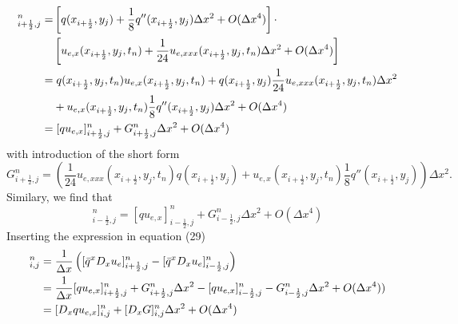 \documentclass[twoside]{article}
\begin{document}
\begin{align}
[\bar{q}D_{x}u_{e}]_{i+\frac{1}{2},j}^{n} =& \left[q(x_{i+\frac{1}{2}},y_{j})+\frac{1}{8}q''(x_{i+\frac{1}{2}},y_{j})\Delta x^{2}+O(\Delta x^{4})\right] \cdot\\ \notag
&\left[u_{e,x}(x_{i+\frac{1}{2}},y_{j},t_{n})+\frac{1}{24}u_{e,xxx}(x_{i+\frac{1}{2}},y_{j},t_{n})\Delta x^{2}+O(\Delta x^{4})\right] \\ \notag
=& \hspace{1mm}q(x_{i+\frac{1}{2}},y_{j},t_{n})u_{e,x}(x_{i+\frac{1}{2}},y_{j},t_{n})+q(x_{i+\frac{1}{2}},y_{j})\frac{1}{24}u_{e,xxx}(x_{i+\frac{1}{2}},y_{j},t_{n})\Delta x^{2}\\ \notag
&+u_{e,x}(x_{i+\frac{1}{2}},y_{j},t_{n})\frac{1}{8}q''(x_{i+\frac{1}{2}},y_{j})\Delta x^{2}+O(\Delta x^{4}) \\ \notag 
=& \hspace{1mm}[qu_{e,x}]_{i+\frac{1}{2},j}^{n}+G_{i+\frac{1}{2},j}^{n}\Delta x^{2}+O(\Delta x^{4})
\end{align}
with introduction of the short form
\begin{equation*}
G_{i+\frac{1}{2},j}^{n}= \left(\frac{1}{24}u_{e,xxx}(x_{i+\frac{1}{2}},y_{j},t_{n})q(x_{i+\frac{1}{2}},y_{j})+u_{e,x}(x_{i+\frac{1}{2}},y_{j},t_{n})\frac{1}{8}q''(x_{i+\frac{1}{2}},y_{j}) \right)\Delta x^{2} .
\end{equation*}
Similary, we find that
\begin{equation}
[\bar{q}D_{x}u_{e}]_{i-\frac{1}{2},j}^{n}=[qu_{e,x}]_{i-\frac{1}{2},j}^{n}+G_{i-\frac{1}{2},j}^{n}\Delta x^{2}+O(\Delta x^{4})
\end{equation}
Inserting the expression in equation (29)
\begin{align*}
[D_{x}\bar{q}^{x}D_{x}u_{e}]_{i,j}^{n} =&\hspace{1mm}\frac{1}{\Delta x}\left([\bar{q}^{x}D_{x}u_{e}]_{i+\frac{1}{2},j}^{n}-[\bar{q}^{x}D_{x}u_{e}]_{i-\frac{1}{2},j}^{n}\right) \\
=&\hspace{1mm} \frac{1}{\Delta x}[qu_{e,x}]_{i+\frac{1}{2},j}^{n}+G_{i+\frac{1}{2},j}^{n}\Delta x^{2}-[qu_{e,x}]_{i-\frac{1}{2},j}^{n}-G_{i-\frac{1}{2},j}^{n}\Delta x^{2}+O(\Delta x^{4})) \\
=&\hspace{1mm} [D_{x}qu_{e,x}]_{i,j}^{n}+[D_{x}G]_{i,j}^{n}\Delta x^{2}+O(\Delta x^{4})
\end{align*}
\end{document}
